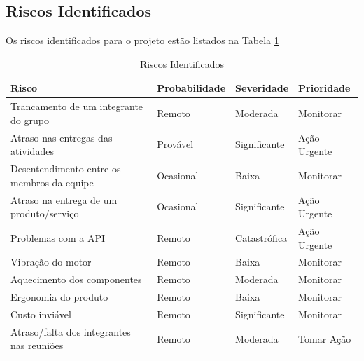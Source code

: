 \begin{apendicesenv}
	\subsection{Riscos Identificados}
	Os riscos identificados para o projeto estão listados na Tabela \ref{riscos_identificados}

\begin{table}[h!]
\centering
\caption{Riscos Identificados}
\label{riscos_identificados}
\begin{tabular}{|llll|}
\hline
\multicolumn{1}{|l|}{\textbf{Risco}}       & \multicolumn{1}{l|}{\textbf{Probabilidade}} & \multicolumn{1}{l|}{\textbf{Severidade}} & \textbf{Prioridade} \\ \hline
Trancamento de um integrante do grupo      & Remoto                                      & Moderada                                 & Monitorar           \\ \hline
Atraso nas entregas das atividades         & Provável                                    & Significante                             & Ação Urgente        \\ \hline
Desentendimento entre os membros da equipe & Ocasional                                   & Baixa                                    & Monitorar           \\ \hline
Atraso na entrega de um produto/serviço    & Ocasional                                   & Significante                             & Ação Urgente        \\ \hline
Problemas com a API                        & Remoto                                      & Catastrófica                             & Ação Urgente        \\ \hline
Vibração do motor                          & Remoto                                      & Baixa                                    & Monitorar           \\ \hline
Aquecimento dos componentes                & Remoto                                      & Moderada                                 & Monitorar           \\ \hline
Ergonomia do produto                       & Remoto                                      & Baixa                                    & Monitorar           \\ \hline
Custo inviável                             & Remoto                                      & Significante                             & Monitorar           \\ \hline
Atraso/falta dos integrantes nas reuniões  & Remoto                                      & Moderada                                 & Tomar Ação          \\ \hline
\end{tabular}
\end{table}


\end{apendicesenv}
